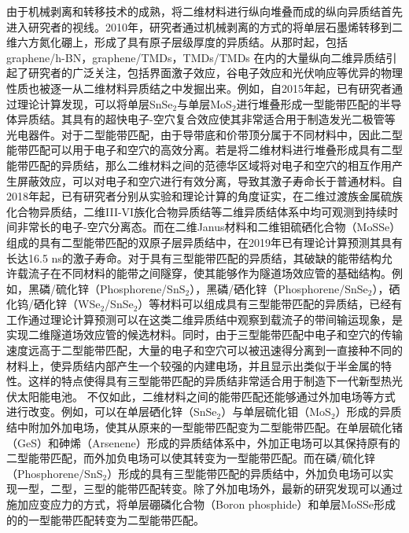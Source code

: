 由于机械剥离和转移技术的成熟，将二维材料进行纵向堆叠而成的纵向异质结首先进入研究者的视线。2010年，研究者通过机械剥离的方式的将单层石墨烯转移到二维六方氮化硼上，形成了具有原子层级厚度的异质结。从那时起，包括 graphene/h-BN，graphene/TMDs，TMDs/TMDs 在内的大量纵向二维异质结引起了研究者的广泛关注，包括界面激子效应，谷电子效应和光伏响应等优异的物理性质也被逐一从二维材料异质结之中发掘出来。例如，自2015年起，已有研究者通过理论计算发现，可以将单层SnSe$_2$与单层MoS$_2$进行堆叠形成一型能带匹配的半导体异质结。其具有的超快电子-空穴复合效应使其非常适合用于制造发光二极管等光电器件。对于二型能带匹配，由于导带底和价带顶分属于不同材料中，因此二型能带匹配可以用于电子和空穴的高效分离。若是将二维材料进行堆叠形成具有二型能带匹配的异质结，那么二维材料之间的范德华区域将对电子和空穴的相互作用产生屏蔽效应，可以对电子和空穴进行有效分离，导致其激子寿命长于普通材料。自2018年起，已有研究者分别从实验和理论计算的角度证实，在二维过渡族金属硫族化合物异质结，二维III-VI族化合物异质结等二维异质结体系中均可观测到持续时间非常长的电子-空穴分离态。而在二维Janus材料和二维钼硫硒化合物（MoSSe）组成的具有二型能带匹配的双原子层异质结中，在2019年已有理论计算预测其具有长达16.5 ns的激子寿命。对于具有三型能带匹配的异质结，其破缺的能带结构允许载流子在不同材料的能带之间隧穿，使其能够作为隧道场效应管的基础结构。例如，黑磷/硫化锌（Phosphorene/SnS$_2$），黑磷/硒化锌（Phosphorene/SnSe$_2$），硒化钨/硒化锌（WSe$_2$/SnSe$_2$）等材料可以组成具有三型能带匹配的异质结，已经有工作通过理论计算预测可以在这类二维异质结中观察到载流子的带间输运现象，是实现二维隧道场效应管的候选材料。同时，由于三型能带匹配中电子和空穴的传输速度远高于二型能带匹配，大量的电子和空穴可以被迅速得分离到一直接种不同的材料上，使异质结内部产生一个较强的内建电场，并且显示出类似于半金属的特性。这样的特点使得具有三型能带匹配的异质结非常适合用于制造下一代新型热光伏太阳能电池。
不仅如此，二维材料之间的能带匹配还能够通过外加电场等方式进行改变。例如，可以在单层硒化锌（SnSe$_2$）与单层硫化钼（MoS$_2$）形成的异质结中附加外加电场，使其从原来的一型能带匹配变为二型能带匹配。在单层硫化锗（GeS）和砷烯（Arsenene）形成的异质结体系中，外加正电场可以其保持原有的二型能带匹配，而外加负电场可以使其转变为一型能带匹配。而在磷/硫化锌（Phosphorene/SnS$_2$）形成的具有三型能带匹配的异质结中，外加负电场可以实现一型，二型，三型的能带匹配转变。除了外加电场外，最新的研究发现可以通过施加应变应力的方式，将单层硼磷化合物（Boron phosphide）和单层MoSSe形成的的一型能带匹配转变为二型能带匹配。

